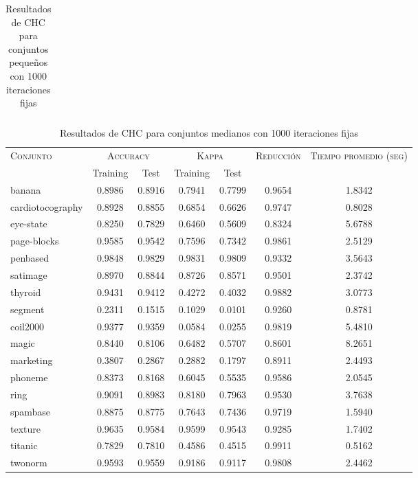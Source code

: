 \begin{table}[]
\begin{tabular}{l c c c c c c}
\hline
\end{tabular}
\caption{Resultados de CHC para conjuntos pequeños con 1000 iteraciones fijas}
\label{res-peq-chc}
\end{table}


\begin{table}[]
\centering
\begin{tabular}{l c c c c c c}
\hline
\multirow{2}{*}{\textsc{Conjunto}}
	& \multicolumn{2}{c}{\textsc{Accuracy}}
	& \multicolumn{2}{c}{\textsc{Kappa}}
	& \textsc{Reducción}
	& \textsc{Tiempo promedio (seg)} \\
	& Training & Test
	& Training & Test \\ 
\hline
\hline

banana & 0.8986 & 0.8916 & 0.7941 & 0.7799 & 0.9654 & 1.8342 \\
cardiotocography & 0.8928 & 0.8855 & 0.6854 & 0.6626 & 0.9747 & 0.8028 \\
eye-state & 0.8250 & 0.7829 & 0.6460 & 0.5609 & 0.8324 & 5.6788 \\
page-blocks & 0.9585 & 0.9542 & 0.7596 & 0.7342 & 0.9861 & 2.5129 \\
penbased & 0.9848 & 0.9829 & 0.9831 & 0.9809 & 0.9332 & 3.5643 \\
satimage & 0.8970 & 0.8844 & 0.8726 & 0.8571 & 0.9501 & 2.3742 \\
thyroid & 0.9431 & 0.9412 & 0.4272 & 0.4032 & 0.9882 & 3.0773 \\
segment & 0.2311 & 0.1515 & 0.1029 & 0.0101 & 0.9260 & 0.8781 \\
coil2000 & 0.9377 & 0.9359 & 0.0584 & 0.0255 & 0.9819 & 5.4810 \\
magic & 0.8440 & 0.8106 & 0.6482 & 0.5707 & 0.8601 & 8.2651 \\
marketing & 0.3807 & 0.2867 & 0.2882 & 0.1797 & 0.8911 & 2.4493 \\
phoneme & 0.8373 & 0.8168 & 0.6045 & 0.5535 & 0.9586 & 2.0545 \\
ring & 0.9091 & 0.8983 & 0.8180 & 0.7963 & 0.9530 & 3.7638 \\
spambase & 0.8875 & 0.8775 & 0.7643 & 0.7436 & 0.9719 & 1.5940 \\
texture & 0.9635 & 0.9584 & 0.9599 & 0.9543 & 0.9285 & 1.7402 \\
titanic & 0.7829 & 0.7810 & 0.4586 & 0.4515 & 0.9911 & 0.5162 \\
twonorm & 0.9593 & 0.9559 & 0.9186 & 0.9117 & 0.9808 & 2.4462 \\

\hline
\end{tabular}
\caption{Resultados de CHC para conjuntos medianos con 1000 iteraciones fijas}
\label{res-med-chc}
\end{table}


